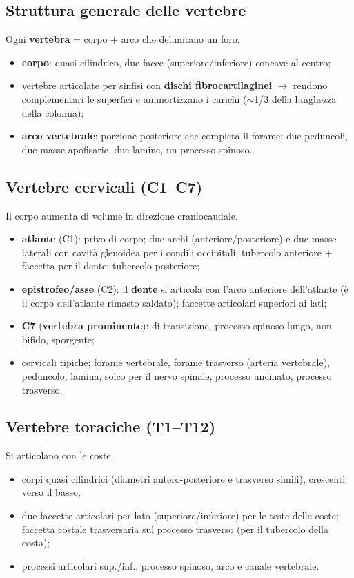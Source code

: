 \subsection{Struttura generale delle vertebre}
Ogni \textbf{vertebra} = corpo + arco che delimitano un foro.
\begin{itemize}
  \item \textbf{corpo}: quasi cilindrico, due facce (superiore/inferiore) concave al centro;
  \item vertebre articolate per sinfisi con \textbf{dischi fibrocartilaginei} $\rightarrow$ rendono
    complementari le superfici e ammortizzano i carichi ($\sim$1/3 della lunghezza della colonna);
  \item \textbf{arco vertebrale}: porzione posteriore che completa il forame; due peduncoli, due
    masse apofisarie, due lamine, un processo spinoso.
\end{itemize}

\subsection{Vertebre cervicali (C1--C7)}
Il corpo aumenta di volume in direzione craniocaudale.
\begin{itemize}
  \item \textbf{atlante} (C1): privo di corpo; due archi (anteriore/posteriore) e due masse
    laterali con cavità glenoidea per i condili occipitali; tubercolo anteriore + faccetta per il
    dente; tubercolo posteriore;
  \item \textbf{epistrofeo/asse} (C2): il \textbf{dente} si articola con l'arco anteriore
    dell'atlante (è il corpo dell'atlante rimasto saldato); faccette articolari superiori ai lati;
  \item \textbf{C7} (\textbf{vertebra prominente}): di transizione, processo spinoso lungo, non
    bifido, sporgente;
  \item cervicali tipiche: forame vertebrale, forame trasverso (arteria vertebrale), peduncolo,
    lamina, solco per il nervo spinale, processo uncinato, processo trasverso.
\end{itemize}

\subsection{Vertebre toraciche (T1--T12)}
Si articolano con le coste.
\begin{itemize}
  \item corpi quasi cilindrici (diametri antero-posteriore e trasverso simili), crescenti verso il
    basso;
  \item due faccette articolari per lato (superiore/inferiore) per le teste delle coste; faccetta
    costale trasversaria sul processo trasverso (per il tubercolo della costa);
  \item processi articolari sup./inf., processo spinoso, arco e canale vertebrale.
\end{itemize}

